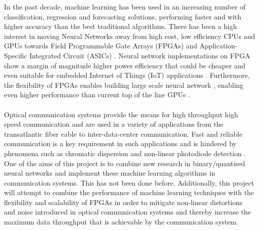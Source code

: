 
\iffalse
Think of the introduction as a development of the context for the reader.

Peruse the literature quickly. 
Highlight the historical progression of the theory and work that has been done, citing the literature as you go. 

Use the citation mechanisms in the editor you are using. 
After the reader has some idea of what the historical background is, mention what is missing in it that your proposal is going to fill.
\fi

In the past decade, machine learning has been used in an increasing number of classification, regression and forecasting solutions, performing faster and with higher accuracy than the best traditional algorithms. There has been a high interest in moving Neural Networks away from high cost, low efficiency CPUs and GPUs towards Field Programmable Gate Arrays (FPGAs) and Application-Specific Integrated Circuit (ASICs) \autocite{7929192}. Neural network implementations on FPGA show a margin of magnitude higher power efficiency that could be cheaper and even suitable for embedded Internet of Things (IoT) applications \autocite{7799795,8954866,8469659,8330546,8693488}. Furthermore, the flexibility of FPGAs enables building large scale neural network \autocite{8823487,7045812}, enabling even higher performance than current top of the line GPUs \autocite{8702332,8412552}. 
\\
\\
Optical communication systems provide the means for high throughput high speed communication and are used in a variety of applications from the transatlantic fiber cable to inter-data-center communication. Fast and reliable communication is a key requirement in such applications and is hindered by phenomena such as chromatic dispersion and non-linear photodiode detection \autocite{8433895}. One of the aims of this project is to combine new research in binary/quantised neural networks and implement these machine learning algorithms in communication systems. This has not been done before. Additionally, this project will attempt to combine the performance of machine learning techniques with the flexibility and scalability of FPGAs in order to mitigate non-linear distortions and noise introduced in optical communication systems and thereby increase the maximum data throughput that is achievable by the communication system. 
\\
\\
